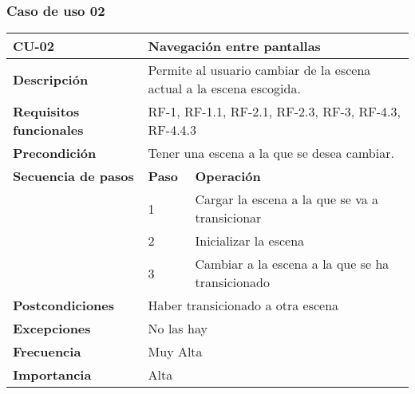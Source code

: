 \subsubsection{Caso de uso 02}
\begin{longtable}{lll}
\textbf{CU-02}                                 & \multicolumn{2}{l}{Navegación entre pantallas}                                           \\ \hline
\endfirsthead
%
\endhead
%
\textbf{Descripción}                             & \multicolumn{2}{l}{Permite al usuario cambiar de la escena actual a la escena escogida.} \\ \hline
\textbf{Requisitos funcionales}                  & \multicolumn{2}{l}{RF-1, RF-1.1, RF-2.1, RF-2.3, RF-3, RF-4.3, RF-4.4.3}                                                         \\ \hline
\textbf{Precondición}                            & \multicolumn{2}{l}{Tener una escena a la que se desea cambiar.}                          \\ \hline
\multicolumn{1}{l|}{\textbf{Secuencia de pasos}} & \textbf{Paso}             & \textbf{Operación}                                           \\ \cline{2-3} 
\multicolumn{1}{l|}{}                            & 1                         & Cargar la escena a la que se va a transicionar               \\
\multicolumn{1}{l|}{}                            & 2                         & Inicializar la escena                                        \\
\multicolumn{1}{l|}{}                            & 3                         & Cambiar a la escena a la que se ha transicionado             \\ \hline
\textbf{Postcondiciones}                         & \multicolumn{2}{l}{Haber transicionado a otra escena}                                    \\ \hline
\textbf{Excepciones}                             & \multicolumn{2}{l}{No las hay}                                                           \\ \hline
\textbf{Frecuencia}                              & \multicolumn{2}{l}{Muy Alta}                                                             \\ \hline
\textbf{Importancia}                             & \multicolumn{2}{l}{Alta}                                                                 \\ \hline
\end{longtable}

